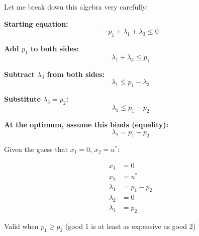 \documentclass[11pt]{article}
\begin{document}
Let me break down this algebra very carefully:

\textbf{Starting equation:}
\begin{equation}
-p_1 + \lambda_1 + \lambda_3 \leq 0
\end{equation}

\textbf{Add $p_1$ to both sides:}
\begin{equation}
\lambda_1 + \lambda_3 \leq p_1
\end{equation}

\textbf{Subtract $\lambda_3$ from both sides:}
\begin{equation}
\lambda_1 \leq p_1 - \lambda_3
\end{equation}

\textbf{Substitute $\lambda_3 = p_2$:}
\begin{equation}
\lambda_1 \leq p_1 - p_2
\end{equation}

\textbf{At the optimum, assume this binds (equality):}
\begin{equation}
\lambda_1 = p_1 - p_2
\end{equation}

\begin{tcolorbox}[colback=green!5!white,colframe=green!75!black,title=Final Answer]
Given the guess that $x_1 = 0$, $x_2 = u^*$:

\begin{align}
x_1 &= 0 \\
x_2 &= u^* \\
\lambda_1 &= p_1 - p_2 \\
\lambda_2 &= 0 \\
\lambda_3 &= p_2
\end{align}

Valid when $p_1 \geq p_2$ (good 1 is at least as expensive as good 2)
\end{tcolorbox}
\end{document}
